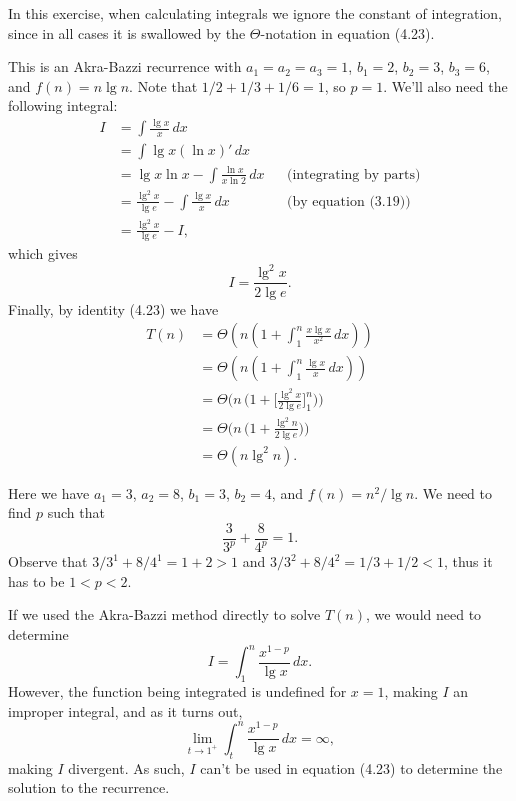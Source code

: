In this exercise, when calculating integrals we ignore the constant of integration, since in all cases it is swallowed by the $\Theta$-notation in equation (4.23).
\vspace*{2\baselineskip}

\subexercise
This is an Akra-Bazzi recurrence with $a_1=a_2=a_3=1$, $b_1=2$, $b_2=3$, $b_3=6$, and $f(n)=n\lg n$.
Note that $1/2+1/3+1/6=1$, so $p=1$.
We'll also need the following integral:
\begin{align*}
    I &= \int\frac{\lg x}{x}\,dx \\
    &= \int\lg x(\ln x)'\,dx \\
    &= \lg x\ln x-\int\frac{\ln x}{x\ln2}\,dx && \text{(integrating by parts)} \\
    &= \frac{\lg^2x}{\lg e}-\int\frac{\lg x}{x}\,dx && \text{(by equation (3.19))} \\[1mm]
    &= \frac{\lg^2x}{\lg e}-I,
\end{align*}
which gives
\[
    I = \frac{\lg^2x}{2\lg e}.
\]
Finally, by identity (4.23) we have
\begin{align*}
    T(n) &= \Theta\left(n\left(1+\int_1^n\frac{x\lg x}{x^2}\,dx\right)\right) \\
    &= \Theta\left(n\left(1+\int_1^n\frac{\lg x}{x}\,dx\right)\right) \\
    &= \Theta\biggl(n\,\biggl(1+\biggl[\frac{\lg^2x}{2\lg e}\biggr]_1^n\biggr)\biggr) \\
    &= \Theta\biggl(n\,\biggl(1+\frac{\lg^2n}{2\lg e}\biggr)\biggr) \\
    &= \Theta(n\lg^2n).
\end{align*}

\subexercise
Here we have $a_1=3$, $a_2=8$, $b_1=3$, $b_2=4$, and $f(n)=n^2/\lg n$.
We need to find $p$ such that
\[
    \frac{3}{3^p}+\frac{8}{4^p} = 1.
\]
Observe that $3/3^1+8/4^1=1+2>1$ and $3/3^2+8/4^2=1/3+1/2<1$, thus it has to be $1<p<2$.

If we used the Akra-Bazzi method directly to solve $T(n)$, we would need to determine
\[
    I = \int_1^n\frac{x^{1-p}}{\lg x}\,dx.
\]
However, the function being integrated is undefined for $x=1$, making $I$ an improper integral, and as it turns out,
\[
    \lim_{t\to1^+}\int_t^n\frac{x^{1-p}}{\lg x}\,dx = \infty,
\]
making $I$ divergent.
As such, $I$ can't be used in equation (4.23) to determine the solution to the recurrence.

